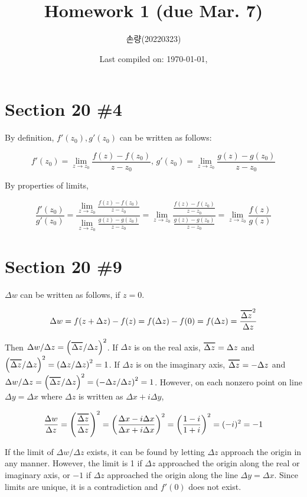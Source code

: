 \documentclass{scrartcl}
\title{Homework 1 (due Mar. 7)}
\author{손량(20220323)}
\date{Last compiled on: \today, \currenttime}
\newcommand\Overline[2][0.8pt]{%
  \begin{tikzpicture}[baseline=(a.base)]
    \node[inner xsep=0pt,inner ysep=1.5pt] (a) {$#2$};
    \draw[line width= #1] (a.north west) -- (a.north east);
  \end{tikzpicture}
}
\begin{document}
\maketitle

\section{Section 20 \#4}
By definition, \(f'(z_0), g'(z_0)\) can be written as follows:

\[
  f'(z_0) = \lim_{z \to z_0} \frac{f(z) - f(z_0)}{z - z_0},\, g'(z_0) = \lim_{z \to z_0} \frac{g(z) - g(z_0)}{z - z_0}
\]

By properties of limits,

\[
  \frac{f'(z_0)}{g'(z_0)} = \frac{\lim_{z \to z_0} \frac{f(z) - f(z_0)}{z - z_0}}{\lim_{z \to z_0} \frac{g(z) - g(z_0)}{z - z_0}} = \lim_{z \to z_0} \frac{\frac{f(z) - f(z_0)}{z - z_0}}{\frac{g(z) - g(z_0)}{z - z_0}} = \lim_{z \to z_0} \frac{f(z)}{g(z)}
\]

\section{Section 20 \#9}
\(\Delta w\) can be written as follows, if \(z = 0\).

\[
  \Delta w = f(z + \Delta z) - f(z) = f(\Delta z) - f(0) = f(\Delta z) = \frac{\Overline{\Delta z}^2}{\Delta z}
\]

Then \(\Delta w/\Delta z = \left(\Overline{\Delta z} / \Delta z\right)^2\).
If \(\Delta z\) is on the real axis, \(\Overline{\Delta z} = \Delta z\) and \(\left(\Overline{\Delta z} / \Delta z\right)^2 = \left( \Delta z / \Delta z \right)^2 = 1\).
If \(\Delta z\) is on the imaginary axis, \(\Overline{\Delta z} = -\Delta z\) and \(\Delta w / \Delta z = \left( \Overline{\Delta z} / \Delta z \right)^2 = \left( -\Delta z / \Delta z \right)^2 = 1\).
However, on each nonzero point on line \(\Delta y = \Delta x\) where \(\Delta z\) is written as \(\Delta x + i\Delta y\),

\[
  \frac{\Delta w}{\Delta z} = \left( \frac{\Overline{\Delta z}}{\Delta z} \right)^2 = \left( \frac{\Delta x - i\Delta x}{\Delta x + i\Delta x} \right)^2 = \left( \frac{1 - i}{1 + i} \right)^2 = (-i)^2 = -1
\]

If the limit of \(\Delta w / \Delta z\) exists, it can be found by letting \(\Delta z\) approach the origin in any manner.
However, the limit is 1 if \(\Delta z\) approached the origin along the real or imaginary axis, or \(-1\) if \(\Delta z\) approached the origin along the line \(\Delta y = \Delta x\).
Since limits are unique, it is a contradiction and \(f'(0)\) does not exist.
\end{document}
